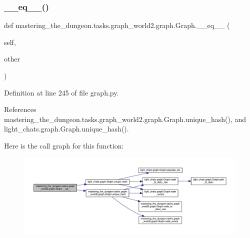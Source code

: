 \subsubsection{\texorpdfstring{\+\_\+\+\_\+eq\+\_\+\+\_\+()}{\_\_eq\_\_()}}
{\footnotesize\ttfamily def mastering\+\_\+the\+\_\+dungeon.\+tasks.\+graph\+\_\+world2.\+graph.\+Graph.\+\_\+\+\_\+eq\+\_\+\+\_\+ (\begin{DoxyParamCaption}\item[{}]{self,  }\item[{}]{other }\end{DoxyParamCaption})}



Definition at line 245 of file graph.\+py.



References mastering\+\_\+the\+\_\+dungeon.\+tasks.\+graph\+\_\+world2.\+graph.\+Graph.\+unique\+\_\+hash(), and light\+\_\+chats.\+graph.\+Graph.\+unique\+\_\+hash().

Here is the call graph for this function\+:
\nopagebreak
\begin{figure}[H]
\begin{center}
\leavevmode
\includegraphics[width=350pt]{classmastering__the__dungeon_1_1tasks_1_1graph__world2_1_1graph_1_1Graph_ab2152a1fc6fa0c5240606478953b5622_cgraph}
\end{center}
\end{figure}
\mbox{\label{classmastering__the__dungeon_1_1tasks_1_1graph__world2_1_1graph_1_1Graph_a38881cfb7d3d74d4a0cb130f946e715e}} 
